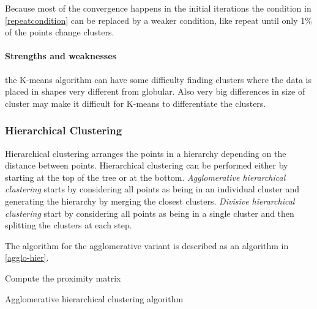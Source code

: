 Because most of the convergence happens in the initial iterations the condition in \cref{repeatcondition} can be replaced by a weaker condition, like repeat until only 1\% of the points change clusters.

\paragraph{Strengths and weaknesses}
the K-means algorithm can have some difficulty finding clusters where the data is placed in shapes very different from globular. 
Also very big differences in size of cluster may make it difficult for K-means to differentiate the clusters.

\subsubsection{Hierarchical Clustering}

Hierarchical clustering arranges the points in a hierarchy depending on the distance between points.
Hierarchical clustering can be performed either by starting at the top of the tree or at the bottom.
\textit{Agglomerative hierarchical clustering} starts by considering all points as being in an individual cluster and generating the hierarchy by merging the closest clusters. 
\textit{Divisive hierarchical clustering} start by considering all points as being in a single cluster and then splitting the clusters at each step.

The algorithm for the agglomerative variant is described as an algorithm in \cref{agglo-hier}.

\begin{algorithm}
\SetAlgoLined
{}

Compute the proximity matrix\\
\caption{Agglomerative hierarchical clustering algorithm}\label{agglo-hier}
\end{algorithm}


